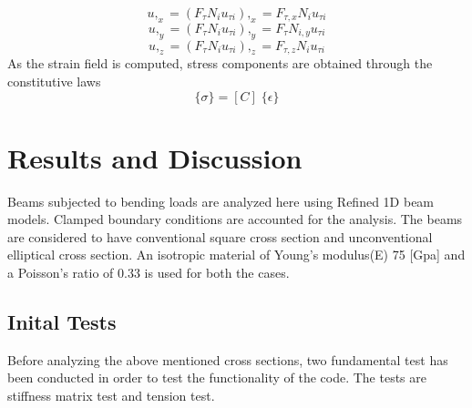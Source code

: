 \documentclass[a4paper,12pt]{article}
\begin{document}
\begin{equation}
u,_{x} = (F_{\tau} N_{i} u_{\tau i}),_{x} = F_{\tau,x} N_{i} u_{\tau i}
\end{equation}
\begin{equation}
u,_{y} = (F_{\tau} N_{i} u_{\tau i}),_{y} = F_{\tau} N_{i,y} u_{\tau i}
\end{equation}
\begin{equation}
u,_{z} = (F_{\tau} N_{i} u_{\tau i}),_{z} = F_{\tau,z} N_{i} u_{\tau i}
\end{equation}
As the strain field is computed, stress components are obtained through the constitutive laws
\begin{equation}
\{\sigma\} = [C]\;\{\epsilon\}
\end{equation}

\section*{Results and Discussion}
\indent\indent\indent\indent Beams subjected to bending loads are analyzed here using Refined 1D beam models. Clamped boundary conditions are accounted for the analysis. The beams are considered to have conventional square cross section and unconventional elliptical cross section. An isotropic material of Young's modulus(E) 75 [Gpa] and a Poisson's ratio of 0.33 is used for both the cases.

\subsection*{Inital Tests}
\indent\indent\indent\indent Before analyzing the above mentioned cross sections, two fundamental test has been conducted in order to test the functionality of the code. The tests are stiffness matrix test and tension test.
\end{document}
